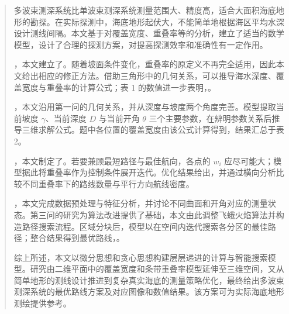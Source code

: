 \documentclass{JXUSTmodeling}
\begin{document}
\label{body:start}

\begin{abstract}

\indent 多波束测深系统比单波束测深系统测量范围大、精度高，适合大面积海底地形的勘探。在实际探测中，海底地形起伏大，不能简单地根据海区平均水深设计测线间隔。本文基于对覆盖宽度、重叠率等的分析，建立了适当的数学模型，设计了合理的探测方案，对提高探测效率和准确性有一定作用。

\indent {}，本文建立了。随着坡面条件变化，重叠率的原定义不再完全适用，因此本文给出相应的修正方法。借助三角形中的几何关系，可以推导海水深度、覆盖宽度与重叠率的计算公式；表 1 的数值进一步表明，。

\indent {}，本文沿用第一问的几何关系，并从深度与坡度两个角度完善。模型提取当前坡度 $\gamma$、当前深度 $D$ 与当前开角 $\theta$ 三个主要参数，在辨明参数关系后推导三维求解公式。题中各位置的覆盖宽度由该公式计算得到，结果汇总于表 2。

\indent {}，本文制定了。若要兼顾最短路径与最佳航向，各点的 $w_i$ 应尽可能大；模型据此将重叠率作为控制条件展开迭代。优化结果给出，并通过横向分析比较不同重叠率下的路线数量与平行方向航线密度。

\indent {}，本文完成数据预处理与特征分析，并讨论不同曲面和开角对应的测量状态。第三问的研究为算法改进提供了基础，本文由此调整飞蛾火焰算法并构造路径搜索流程。区域分块后，模型以在空间内迭代搜索各分区的最佳路径；整合结果得到最优路线，。

\indent 综上所述，本文以微分思想和贪心思想构建层层递进的计算与智能搜索模型。研究由二维平面中的覆盖宽度和条带重叠率模型延伸至三维空间，又从简单地形的测线设计推进到复杂真实海底的测量策略优化，最终给出多波束测深系统的最优路线方案及对应图像和数值结果。该方案可为实际海底地形测绘提供参考。

\end{abstract}
\end{document}
